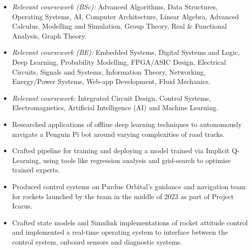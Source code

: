 \documentclass[9pt,a4paper,ragged2e]{altacv}
\begin{document}
\begin{paracol}{2}


	\begin{itemize}
		\item \textit{Relevant coursework (BSc):} Advanced Algorithms, Data Structures, Operating Systems, AI, Computer Architecture, Linear Algebra, Advanced Calculus, Modelling and Simulation, Group Theory, Real \& Functional Analysis, Graph Theory.
		\item \textit{Relevant coursework (BE):} Embedded Systems, Digital Systems and Logic, Deep Learning, Probability Modelling, FPGA/ASIC Design,  Electrical Circuits, Signals and Systems, Information Theory, Networking, Energy/Power Systems, Web-app Development, Fluid Mechanics.
	\end{itemize}

	\divider

	\begin{itemize}
		\item \textit{Relevant coursework:} Integrated Circuit Design, Control Systems, Electromagnetics, Artificial Intelligence (AI) and Machine Learning.
	\end{itemize}


	\begin{itemize}
		\item Researched applications of offline deep learning techniques to autonomously navigate a Penguin Pi bot around varying complexities of road tracks.
		\item Crafted pipeline for training and deploying a model trained via Implicit Q-Learning, using tools like regression analysis and grid-search to optimise trained experts.
	\end{itemize}

	\divider

	\begin{itemize}
		\item Produced control systems on Purdue Orbital's guidance and navigation team for rockets launched by the team in the middle of 2023 as part of Project Icarus.
		\item Crafted state models and Simulink implementations of rocket attitude control and implemented a real-time operating system to interface between the control system, onboard sensors and diagnostic systems.
	\end{itemize}


\end{paracol}
\end{document}
